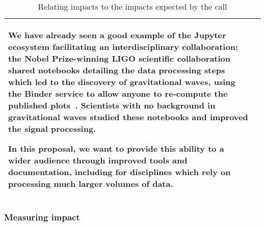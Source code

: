 \begin{table}[h!]
\begin{center}
\begin{tabular}{>{\raggedright}m{}|m{}}
        We have already seen a good example of the Jupyter ecosystem facilitating an
        interdisciplinary collaboration: the Nobel Prize-winning LIGO scientific collaboration shared
        notebooks detailing the data processing steps which led to the discovery of
        gravitational waves, using the Binder service to allow anyone to re-compute
        the published plots~\cite{ligo-open-science}. Scientists with no background in gravitational waves
        studied these notebooks and improved the signal processing.

        In this proposal, we want to provide this ability to a wider audience through
        improved tools and documentation,
        including for disciplines which rely on processing much larger volumes of
        data.\\
      \bottomrule
    \end{tabular}
  \end{center}
  \caption{Relating \TheProject impacts to the impacts expected by the call \label{table:impact-comparison}}
\end{table}

\subsubsection{Measuring impact}\label{sec:KPIs}

